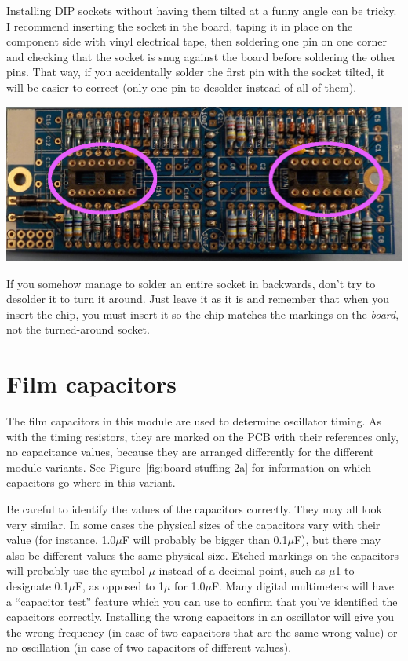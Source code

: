 Installing DIP sockets without having them tilted at a funny angle can be
tricky.  I recommend inserting the socket in the board, taping it in place
on the component side with vinyl electrical tape, then soldering one pin on
one corner and checking that the socket is snug against the board before
soldering the other pins.  That way, if you accidentally solder the first
pin with the socket tilted, it will be easier to correct (only one pin to
desolder instead of all of them).

\noindent\includegraphics[width=\linewidth]{dip-2A.jpg}

If you somehow manage to solder an entire socket in backwards, don't try to
desolder it to turn it around.  Just leave it as it is and remember that
when you insert the chip, you must insert it so the chip matches the
markings on the \emph{board}, not the turned-around socket.

\section{Film capacitors}

The film capacitors in this module are used to determine oscillator timing. 
As with the timing resistors, they are marked on the PCB with their
references only, no capacitance values, because they are arranged
differently for the different module variants.  See
Figure~\ref{fig:board-stuffing-2a} for information on which capacitors go
where in this variant.

Be careful to identify the values of the capacitors correctly.  They may all
look very similar.  In some cases the physical sizes of the capacitors vary
with their value (for instance, 1.0$\mu$F will probably be bigger than
0.1$\mu$F), but there may also be different values the same physical size. 
Etched markings on the capacitors will probably use the symbol $\mu$ instead
of a decimal point, such as $\mu$1 to designate 0.1$\mu$F, as opposed to
1$\mu$ for 1.0$\mu$F.  Many digital multimeters will have a ``capacitor
test'' feature which you can use to confirm that you've identified the
capacitors correctly.  Installing the wrong capacitors in an oscillator
will give you the wrong frequency (in case of two capacitors that are the
same wrong value) or no oscillation (in case of two capacitors of different
values).

